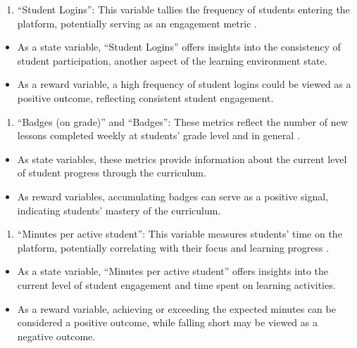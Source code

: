 \documentclass[
  number,
  preprint,
  3p,
  onecolumn]{elsarticle}
\providecommand{\tightlist}{%
  \setlength{\itemsep}{0pt}\setlength{\parskip}{0pt}}\usepackage{longtable,booktabs,array}
\begin{document}
\begin{enumerate}
\def\labelenumi{\arabic{enumi}.}
\setcounter{enumi}{1}
\tightlist
\item
  ``Student Logins'': This variable tallies the frequency of students
  entering the platform, potentially serving as an engagement metric
  \citep{zearn2024}.
\end{enumerate}

\begin{itemize}
\tightlist
\item
  As a state variable, ``Student Logins'' offers insights into the
  consistency of student participation, another aspect of the learning
  environment state.
\item
  As a reward variable, a high frequency of student logins could be
  viewed as a positive outcome, reflecting consistent student
  engagement.
\end{itemize}

\begin{enumerate}
\def\labelenumi{\arabic{enumi}.}
\setcounter{enumi}{2}
\tightlist
\item
  ``Badges (on grade)'' and ``Badges'': These metrics reflect the number
  of new lessons completed weekly at students' grade level and in
  general \citep{zearn2024a}.
\end{enumerate}

\begin{itemize}
\tightlist
\item
  As state variables, these metrics provide information about the
  current level of student progress through the curriculum.
\item
  As reward variables, accumulating badges can serve as a positive
  signal, indicating students' mastery of the curriculum.
\end{itemize}

\begin{enumerate}
\def\labelenumi{\arabic{enumi}.}
\setcounter{enumi}{3}
\tightlist
\item
  ``Minutes per active student'': This variable measures students' time
  on the platform, potentially correlating with their focus and learning
  progress \citep{zearn2022}.
\end{enumerate}

\begin{itemize}
\tightlist
\item
  As a state variable, ``Minutes per active student'' offers insights
  into the current level of student engagement and time spent on
  learning activities.
\item
  As a reward variable, achieving or exceeding the expected minutes can
  be considered a positive outcome, while falling short may be viewed as
  a negative outcome.
\end{itemize}
\end{document}
